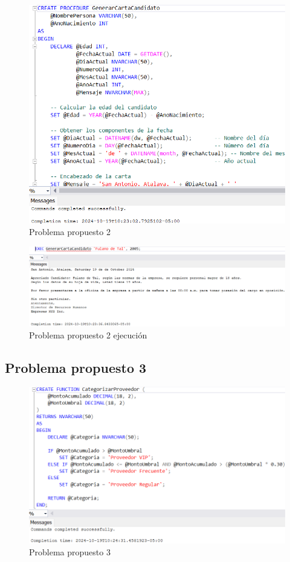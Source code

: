 \begin{figure}[H]
  \centering
  \includegraphics[scale = 0.5]{Imagenes/probs_propuestos/pp2.png}
  \caption{Problema propuesto 2}
\end{figure}

\begin{figure}[H]
  \centering
  \includegraphics[scale = 0.5]{Imagenes/probs_propuestos/pp2_exe.png}
  \caption{Problema propuesto 2 ejecución}
\end{figure}

\subsection{Problema propuesto 3}

\begin{figure}[H]
  \centering
  \includegraphics[scale = 0.5]{Imagenes/probs_propuestos/pp3.png}
  \caption{Problema propuesto 3}
\end{figure}

